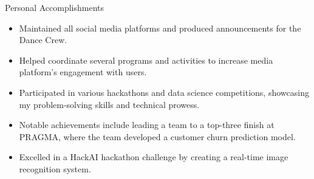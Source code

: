 \documentclass{resume} %
\begin{document}
\begin{rSection}{Personal Accomplishments} 
\vspace{0em}
\begin{itemize}
    \itemsep -6pt {} 
     \item Maintained all social media platforms and produced announcements for the Dance Crew.
     \item Helped coordinate several programs and activities to increase media platform's engagement with users.
     \item Participated in various hackathons and data science competitions, showcasing my problem-solving skills and technical prowess.
     \item Notable achievements include leading a team to a top-three finish at PRAGMA, where the team developed a customer churn prediction model.
     \item Excelled in a HackAI hackathon challenge by creating a real-time image recognition system.
 \end{itemize}


\end{rSection}

\end{document}
